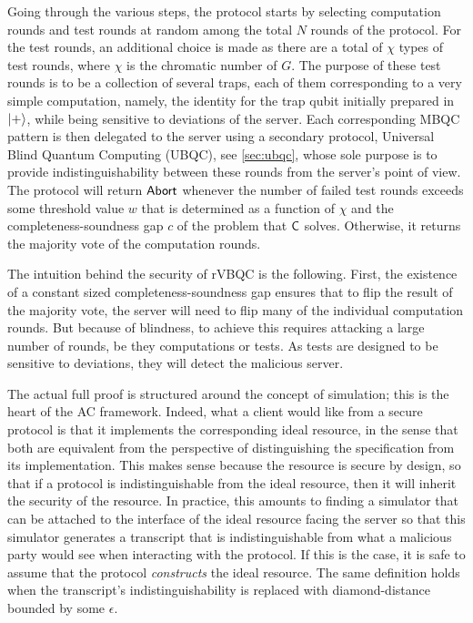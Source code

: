 Going through the various steps, the protocol starts by selecting computation rounds and test rounds at random among the total \(N\) rounds of the protocol. For the test rounds, an additional choice is made as there are a total of \(\chi\) types of test rounds, where \(\chi\) is the chromatic number of \(G\). The purpose of these test rounds is to be a collection of several traps, each of them corresponding to a very simple computation, namely, the identity for the trap qubit initially prepared in \(\ket +\), while being sensitive to deviations of the server. Each corresponding MBQC pattern is then delegated to the server using a secondary protocol, Universal Blind Quantum Computing (UBQC), see \cref{sec:ubqc}, whose sole purpose is to provide indistinguishability between these rounds from the server's point of view. The protocol will return \(\mathsf{Abort}\) whenever the number of failed test rounds exceeds some threshold value \(w\) that is determined as a function of \(\chi\) and the completeness-soundness gap \(c\) of the problem that \(\mathsf{C}\) solves. Otherwise, it returns the majority vote of the computation rounds.

The intuition behind the security of rVBQC is the following. First, the existence of a constant sized completeness-soundness gap ensures that to flip the result of the majority vote, the server will need to flip many of the individual computation rounds. But because of blindness, to achieve this requires attacking a large number of rounds, be they computations or tests. As tests are designed to be sensitive to deviations, they will detect the malicious server.

The actual full proof is structured around the concept of simulation; this is the heart of the AC framework. Indeed, what a client would like from a secure protocol is that it implements the corresponding ideal resource, in the sense that both are equivalent from the perspective of distinguishing the specification from its implementation. This makes sense because the resource is secure by design, so that if a protocol is indistinguishable from the ideal resource, then it will inherit the security of the resource. In practice, this amounts to finding a simulator that can be attached to the interface of the ideal resource facing the server so that this simulator generates a transcript that is indistinguishable from what a malicious party would see when interacting with the protocol. If this is the case, it is safe to assume that the protocol \emph{constructs} the ideal resource. The same definition holds when the transcript's indistinguishability is replaced with diamond-distance bounded by some \(\epsilon\).

